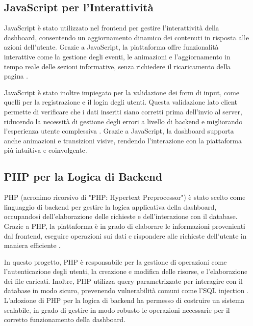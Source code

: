 \subsection{JavaScript per l’Interattività}
JavaScript è stato utilizzato nel frontend per gestire l'interattività della dashboard, consentendo un aggiornamento dinamico dei contenuti in risposta alle azioni dell'utente. Grazie a JavaScript, la piattaforma offre funzionalità interattive come la gestione degli eventi, le animazioni e l'aggiornamento in tempo reale delle sezioni informative, senza richiedere il ricaricamento della pagina \cite{flanagan2011javascript}.


JavaScript è stato inoltre impiegato per la validazione dei form di input, come quelli per la registrazione e il login degli utenti. Questa validazione lato client permette di verificare che i dati inseriti siano corretti prima dell'invio al server, riducendo la necessità di gestione degli errori a livello di backend e migliorando l’esperienza utente complessiva \cite{wroblewski2011web}. Grazie a JavaScript, la dashboard supporta anche animazioni e transizioni visive, rendendo l'interazione con la piattaforma più intuitiva e coinvolgente.

\subsection{PHP per la Logica di Backend}
PHP (acronimo ricorsivo di "PHP: Hypertext Preprocessor") è stato scelto come linguaggio di backend per gestire la logica applicativa della dashboard, occupandosi dell'elaborazione delle richieste e dell'interazione con il database. Grazie a PHP, la piattaforma è in grado di elaborare le informazioni provenienti dal frontend, eseguire operazioni sui dati e rispondere alle richieste dell'utente in maniera efficiente \cite{esposito2020learning}.

In questo progetto, PHP è responsabile per la gestione di operazioni come l'autenticazione degli utenti, la creazione e modifica delle risorse, e l’elaborazione dei file caricati. Inoltre, PHP utilizza query parametrizzate per interagire con il database in modo sicuro, prevenendo vulnerabilità comuni come l'SQL injection \cite{mccool2012php}. L'adozione di PHP per la logica di backend ha permesso di costruire un sistema scalabile, in grado di gestire in modo robusto le operazioni necessarie per il corretto funzionamento della dashboard.

